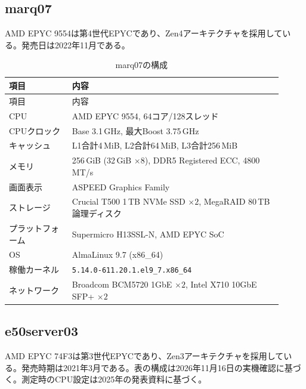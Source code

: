 \documentclass[../main.tex]{subfiles}
\begin{document}
\subsection{marq07}
\label{sec:environment-marq07}
AMD EPYC 9554は第4世代EPYCであり、Zen4アーキテクチャを採用している。発売日は2022年11月である。
\begingroup
\small
\renewcommand{\arraystretch}{1.2}
\begin{longtable}{|p{0.21\linewidth}|p{0.70\linewidth}|}
\caption{marq07の構成}\label{tab:environment-marq07}\\
\hline
項目 & 内容 \\
\hline
\endfirsthead
\hline
項目 & 内容 \\
\hline
\endhead
CPU & AMD EPYC 9554, 64コア/128スレッド \\
\hline
CPUクロック & Base 3.1\,GHz, 最大Boost 3.75\,GHz \\
\hline
キャッシュ & L1合計4\,MiB, L2合計64\,MiB, L3合計256\,MiB \\
\hline
メモリ & 256\,GiB (32\,GiB $\times 8$), DDR5 Registered ECC, 4800\,MT/s \\
\hline
画面表示 & ASPEED Graphics Family \\
\hline
ストレージ & Crucial T500 1\,TB NVMe SSD $\times 2$, MegaRAID 80\,TB論理ディスク \\
\hline
プラットフォーム & Supermicro H13SSL-N, AMD EPYC SoC \\
\hline
OS & AlmaLinux 9.7 (x86\_64) \\
\hline
稼働カーネル & \texttt{5.14.0-611.20.1.el9\_7.x86\_64} \\
\hline
ネットワーク & Broadcom BCM5720 1GbE $\times 2$, Intel X710 10GbE SFP+ $\times 2$ \\
\hline
\end{longtable}
\endgroup


\subsection{e50server03}
\label{sec:environment-e50server03}
AMD EPYC 74F3は第3世代EPYCであり、Zen3アーキテクチャを採用している。発売時期は2021年3月である。表の構成は2026年11月16日の実機確認に基づく。測定時のCPU設定は2025年の発表資料に基づく。
\end{document}
